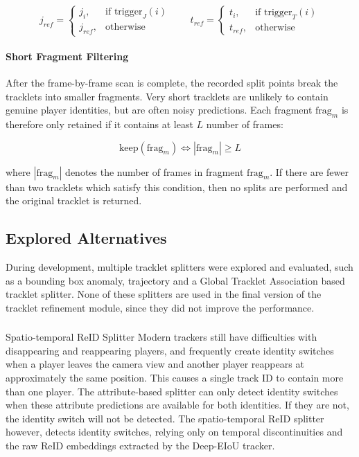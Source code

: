\begin{equation}
    j_{ref} = 
    \begin{cases}
        j_i, & \text{if trigger}_J(i) \\
        j_{ref}, & \text{otherwise}
    \end{cases}
    \qquad
    t_{ref} = 
    \begin{cases}
        t_i, & \text{if trigger}_T(i) \\
        t_{ref}, & \text{otherwise}
    \end{cases}
\end{equation}

\paragraph{Short Fragment Filtering}
After the frame-by-frame scan is complete, the recorded split points break the tracklets into smaller fragments. Very short tracklets are unlikely to contain genuine player identities, but are often noisy predictions. Each fragment $\text{frag}_m$ is therefore only retained if it contains at least $L$ number of frames:

\begin{equation}
    \text{keep}({\text{frag}_m}) \iff |\text{frag}_m| \geq L
\end{equation}

where $|\text{frag}_m|$ denotes the number of frames in fragment $\text{frag}_m$. If there are fewer than two tracklets which satisfy this condition, then no splits are performed and the original tracklet is returned.




\subsection{Explored Alternatives}
During development, multiple tracklet splitters were explored and evaluated, such as a bounding box anomaly, trajectory and a Global Tracklet Association based tracklet splitter. None of these splitters are used in the final version of the tracklet refinement module, since they did not improve the performance.



\subsubsection{}{Spatio-temporal ReID Splitter}\label{reid_spatio_temporal_splitter}
Modern trackers still have difficulties with disappearing and reappearing players, and frequently create identity switches when a player leaves the camera view and another player reappears at approximately the same position. This causes a single track ID to contain more than one player. The attribute-based splitter can only detect identity switches when these attribute predictions are available for both identities. If they are not, the identity switch will not be detected. The spatio-temporal ReID splitter however, detects identity switches, relying only on temporal discontinuities and the raw ReID embeddings extracted by the Deep-EIoU tracker. 

